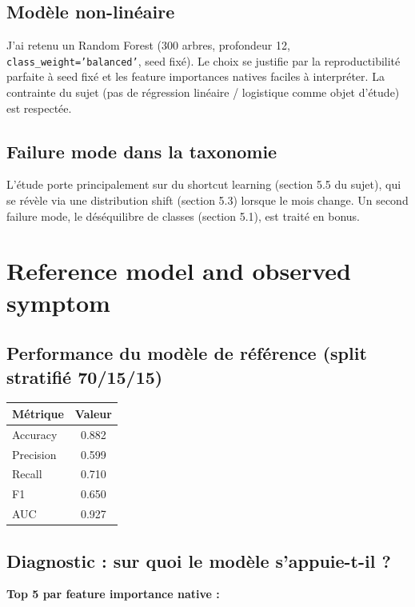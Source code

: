 \documentclass[11pt,a4paper]{article}
\newcommand{\code}[1]{\texttt{\small#1}}
\begin{document}
\subsection*{Modèle non-linéaire}

J'ai retenu un Random Forest (300 arbres, profondeur 12, \code{class\_weight='balanced'}, seed fixé). Le choix se justifie par la reproductibilité parfaite à seed fixé et les feature importances natives faciles à interpréter. La contrainte du sujet (pas de régression linéaire / logistique comme objet d'étude) est respectée.

\subsection*{Failure mode dans la taxonomie}

L'étude porte principalement sur du shortcut learning (section 5.5 du sujet), qui se révèle via une distribution shift (section 5.3) lorsque le mois change. Un second failure mode, le déséquilibre de classes (section 5.1), est traité en bonus.

\section{Reference model and observed symptom}

\subsection*{Performance du modèle de référence (split stratifié 70/15/15)}

\begin{center}
\begin{tabular}{lc}
\toprule
\textbf{Métrique} & \textbf{Valeur} \\
\midrule
Accuracy  & 0.882 \\
Precision & 0.599 \\
Recall    & 0.710 \\
F1        & 0.650 \\
AUC       & 0.927 \\
\bottomrule
\end{tabular}
\end{center}

\subsection*{Diagnostic : sur quoi le modèle s'appuie-t-il ?}

\textbf{Top 5 par feature importance native :}
\end{document}
